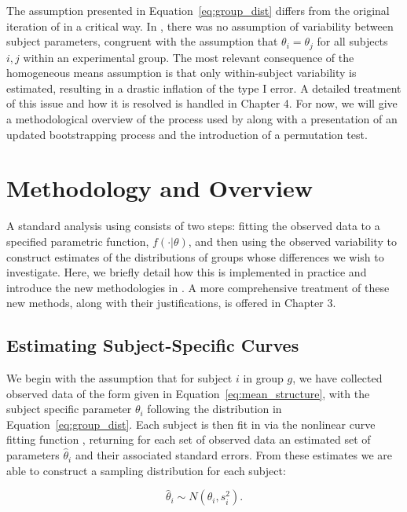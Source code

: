 The assumption presented in Equation~\ref{eq:group_dist} differs from the original iteration of  in a critical way. In \citet{oleson2017detecting}, there was no assumption of variability between subject parameters, congruent with the assumption that $\theta_i = \theta_j$ for all subjects $i, j$ within an experimental group. The most relevant consequence of the homogeneous means assumption is that only within-subject variability is estimated, resulting in a drastic inflation of the type I error. A detailed treatment of this issue and how it is resolved is handled in Chapter 4. For now, we will give a methodological overview of the process used by  along with a presentation of an updated bootstrapping process and the introduction of a permutation test.




\section{Methodology and Overview} 

A standard analysis using  consists of two steps: fitting the observed data to a specified parametric function, $f(\cdot|\theta)$, and then using the observed variability to construct estimates of the distributions of groups whose differences we wish to investigate.  Here, we briefly detail how this is implemented in practice and introduce the new methodologies in . A more comprehensive treatment of these new methods, along with their justifications, is offered in Chapter 3. 



\subsection{Estimating Subject-Specific Curves}

We begin with the assumption that for subject $i$ in group $g$, we have collected observed data of the form given in Equation~\ref{eq:mean_structure}, with the subject specific parameter $\theta_i$ following the distribution in Equation~\ref{eq:group_dist}. Each subject is then fit in  via the nonlinear curve fitting function , returning for each set of observed data an estimated set of parameters $\hat{\theta}_i$ and their associated standard errors. From these estimates we are able to construct a sampling distribution for each subject:

\begin{equation}\label{eq:sub_dist}
\hat{\theta}_i \sim N(\theta_i, s_i^2).
\end{equation}

